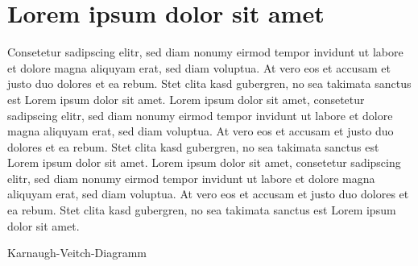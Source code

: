\documentclass[
    a4paper,             %
    12pt,                %
    headheight=34pt,     %
    parskip,             %
    bibliography=totoc,  %
    index=totoc,         %
    listof=totoc,        %
    ]{scrartcl}          %
\begin{document}
    
    
    \begin{noPageNumber}                   %
        \titlePage                         %
    \end{noPageNumber}
    
    \begin{noPageNumber}                   %
        \tableofcontents                   %
    \end{noPageNumber}
    
    \section{Lorem ipsum dolor sit amet}
        Consetetur sadipscing elitr, sed diam nonumy eirmod tempor invidunt ut labore et dolore magna aliquyam erat, sed diam voluptua. At vero eos et accusam et justo duo dolores et ea rebum. Stet clita kasd gubergren, no sea takimata sanctus est Lorem ipsum dolor sit amet. Lorem ipsum dolor sit amet, consetetur sadipscing elitr, sed diam nonumy eirmod tempor invidunt ut labore et dolore magna aliquyam erat, sed diam voluptua.\citep[vgl.][Page 8]{weinzierl_handbuch_2008} At vero eos et accusam et justo duo dolores et ea rebum. Stet clita kasd gubergren, no sea takimata sanctus est Lorem ipsum dolor sit amet. Lorem ipsum dolor sit amet, consetetur sadipscing elitr, sed diam nonumy eirmod tempor invidunt ut labore et dolore magna aliquyam erat, sed diam voluptua. At vero eos et accusam et justo duo dolores et ea rebum. Stet clita kasd gubergren, no sea takimata sanctus est Lorem ipsum dolor sit amet.
    
        \begin{table}[H]
            \centering
            \begin{adjustbox}{max width=\textwidth} %
                \bgroup\def\arraystretch{1.5} %
                \begin{kvTable44}
                \end{kvTable44}
                \egroup
            \end{adjustbox}
            \caption{Karnaugh-Veitch-Diagramm }  %
            \label{tab:exampleTable} %
        \end{table}   
    
\end{document}
